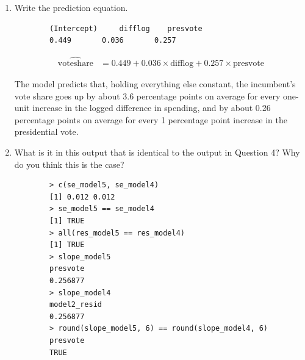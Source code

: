 \documentclass[12pt,letterpaper]{article}
\begin{document}
\begin{enumerate}
		\noindent Both coefficients are smaller than in the bivariate models. The \texttt{difflog} coefficient went from 0.042 in Question 1 to 0.036 here, and the \texttt{presvote} coefficient went from 0.388 in Question 3 to 0.257 here. This is because \texttt{difflog} and \texttt{presvote} are related to each other (as Question 2 showed), so in the bivariate models each one was partly picking up the effect of the other. Once both are in the same model, each coefficient only shows the part of the relationship that belongs to that variable. The drop is much larger for \texttt{presvote}, which means a notable amount of its relationship with \texttt{voteshare} in Question 3 was connected to spending.
		
		\noindent The intercept (0.449) is the predicted vote share when both \texttt{difflog} and \texttt{presvote} are zero. Since no district has a presidential vote share near zero, the intercept doesn't have a meaningful interpretation on its own. The $R^2$ of 0.450 means the two variables together explain about 45\% of the variation in incumbents' vote share. This is higher than either variable explained alone, but lower than the two added together independently, because some of their explained variation overlaps. Again, these cannot be understood as causal effects.
		\vspace{1cm}
		
		\item Write the prediction equation.
		
		\begin{verbatim}
		(Intercept)     difflog    presvote 
		0.449       0.036       0.257
		\end{verbatim}
		
		\begin{align*}
			\widehat{\text{voteshare}} &= 0.449 + 0.036 \times \text{difflog} + 0.257 \times \text{presvote}
		\end{align*}
		
		\noindent The model predicts that, holding everything else constant, the incumbent's vote share goes up by about 3.6 percentage points on average for every one-unit increase in the logged difference in spending, and by about 0.26 percentage points on average for every 1 percentage point increase in the presidential vote.
		\vspace{1cm}
		
		\item What is it in this output that is identical to the output in Question 4? Why do you think this is the case?
		
		\begin{verbatim}
		> c(se_model5, se_model4)
		[1] 0.012 0.012
		> se_model5 == se_model4
		[1] TRUE
		> all(res_model5 == res_model4)
		[1] TRUE
		> slope_model5
		presvote 
		0.256877 
		> slope_model4
		model2_resid 
		0.256877 
		> round(slope_model5, 6) == round(slope_model4, 6)
		presvote 
		TRUE 
		\end{verbatim}
		

\end{enumerate}
\end{document}
